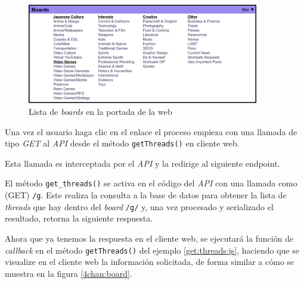 \documentclass[12pt,a4paper,titlepage]{article}
\begin{document}
    \begin{figure}[ht]
        \centering
        \caption{Lista de \textit{boards} en la portada de la web}\bigskip
        \label{dchan:boardlist}
        \includegraphics[width=0.9\textwidth]{media/4channel-board-list.png}
    \end{figure}

    Una vez el usuario haga clic en el enlace el proceso empieza con una llamada de tipo \textit{GET} al \textit{API} desde el método \texttt{getThreads()} en cliente web.

    

    Esta llamada es interceptada por el \textit{API} y la redirige al siguiente endpoint.

    

    El método \texttt{get\_threads()} se activa en el código del \textit{API} con una llamada como (GET) \texttt{/g}. Este realiza la consulta a la base de datos para obtener la lista de \textit{threads} que hay dentro del \textit{board} \texttt{/g/} y, una vez procesado y serializado el resultado, retorna la siguiente respuesta.

    

    Ahora que ya tenemos la respuesta en el cliente web, se ejecutará la función de \textit{callback} en el método \texttt{getThreads()} del ejemplo \ref{get:threads:js}, haciendo que se visualize en el cliente web la información solicitada, de forma similar a cómo se muestra en la figura \ref{4chan:board}.
\end{document}
